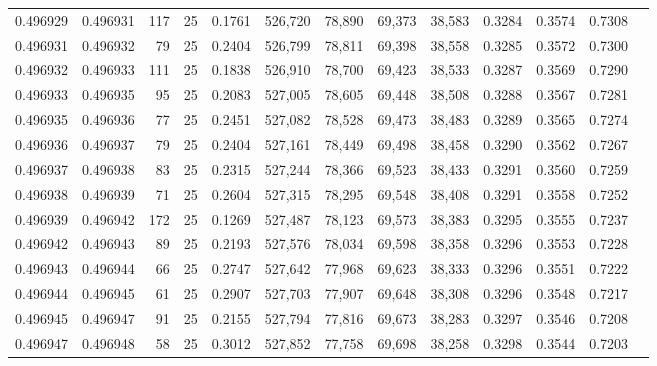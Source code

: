 \begin{tabular}{rrrrrrrrrrrrr}
0.496929 & 0.496931 &   117 &  25 &                                     0.1761 & 526,720 &  78,890 &  69,373 &  38,583 & 0.3284 & 0.3574 & 0.7308 \\
0.496931 & 0.496932 &    79 &  25 &                                     0.2404 & 526,799 &  78,811 &  69,398 &  38,558 & 0.3285 & 0.3572 & 0.7300 \\
0.496932 & 0.496933 &   111 &  25 &                                     0.1838 & 526,910 &  78,700 &  69,423 &  38,533 & 0.3287 & 0.3569 & 0.7290 \\
0.496933 & 0.496935 &    95 &  25 &                                     0.2083 & 527,005 &  78,605 &  69,448 &  38,508 & 0.3288 & 0.3567 & 0.7281 \\
0.496935 & 0.496936 &    77 &  25 &                                     0.2451 & 527,082 &  78,528 &  69,473 &  38,483 & 0.3289 & 0.3565 & 0.7274 \\
0.496936 & 0.496937 &    79 &  25 &                                     0.2404 & 527,161 &  78,449 &  69,498 &  38,458 & 0.3290 & 0.3562 & 0.7267 \\
0.496937 & 0.496938 &    83 &  25 &                                     0.2315 & 527,244 &  78,366 &  69,523 &  38,433 & 0.3291 & 0.3560 & 0.7259 \\
0.496938 & 0.496939 &    71 &  25 &                                     0.2604 & 527,315 &  78,295 &  69,548 &  38,408 & 0.3291 & 0.3558 & 0.7252 \\
0.496939 & 0.496942 &   172 &  25 &                                     0.1269 & 527,487 &  78,123 &  69,573 &  38,383 & 0.3295 & 0.3555 & 0.7237 \\
0.496942 & 0.496943 &    89 &  25 &                                     0.2193 & 527,576 &  78,034 &  69,598 &  38,358 & 0.3296 & 0.3553 & 0.7228 \\
0.496943 & 0.496944 &    66 &  25 &                                     0.2747 & 527,642 &  77,968 &  69,623 &  38,333 & 0.3296 & 0.3551 & 0.7222 \\
0.496944 & 0.496945 &    61 &  25 &                                     0.2907 & 527,703 &  77,907 &  69,648 &  38,308 & 0.3296 & 0.3548 & 0.7217 \\
0.496945 & 0.496947 &    91 &  25 &                                     0.2155 & 527,794 &  77,816 &  69,673 &  38,283 & 0.3297 & 0.3546 & 0.7208 \\
0.496947 & 0.496948 &    58 &  25 &                                     0.3012 & 527,852 &  77,758 &  69,698 &  38,258 & 0.3298 & 0.3544 & 0.7203 \\

\end{tabular}

